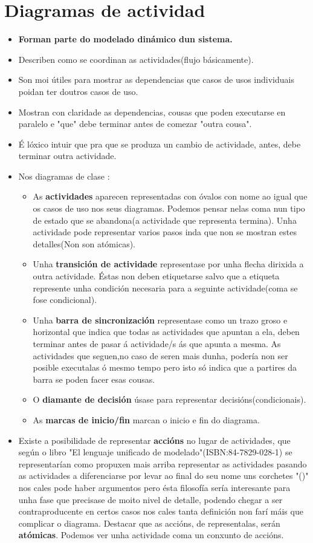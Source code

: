 \section{Diagramas de actividad}
	\begin{itemize}
		\item \textbf{Forman parte do modelado dinámico dun sistema.}
		\item Describen como se coordinan as actividades(flujo básicamente).
		\item Son moi útiles para mostrar as dependencias que casos de usos individuais poidan ter doutros casos de uso.
		\item Mostran con claridade as dependencias, cousas que poden executarse en paralelo e "que" debe terminar antes de comezar "outra cousa".
		\item É lóxico intuir que pra que se produza un cambio de actividade, antes, debe terminar outra actividade.
		\item Nos diagramas de clase :
		\begin{itemize}
			\item As \textbf{actividades} aparecen representadas con óvalos con nome ao igual que os casos de uso nos seus diagramas. Podemos pensar nelas coma nun tipo de estado que se abandona(a actividade que representa termina). Unha actividade pode representar varios pasos inda que non se mostran estes detalles(Non son atómicas).
			\item Unha \textbf{transición de actividade} representase por unha flecha dirixida a outra actividade. Éstas non deben etiquetarse salvo que a etiqueta represente unha condición necesaria para a seguinte actividade(coma se fose condicional).
			\item Unha \textbf{barra de sincronización} representase como un trazo groso e horizontal que indica que todas as actividades que apuntan a ela, deben terminar antes de pasar á actividade/s ás que apunta a mesma. As actividades que seguen,no caso de seren mais dunha, podería non ser posible executalas ó mesmo tempo pero isto só indica que a partires da barra se poden facer esas cousas.
			\item O \textbf{diamante de decisión} úsase para representar decisións(condicionais).
			\item As \textbf{marcas de inicio/fin} marcan o inicio e fin do diagrama.
		\end{itemize}
		\item Existe a posibilidade de representar \textbf{accións} no lugar de actividades, que según o libro "El lenguaje unificado de modelado"(ISBN:84-7829-028-1) se representarían como propuxen mais arriba representar as actividades pasando as actividades a diferenciarse por levar ao final do seu nome uns corchetes "()" nos cales pode haber argumentos pero ésta filosofía sería interesante para unha fase que precisase de moito nivel de detalle, podendo chegar a ser contraproducente en certos casos nos cales tanta definición non farí máis que complicar o diagrama. Destacar que as accións, de representalas, serán \textbf{atómicas}. Podemos ver unha actividade coma un conxunto de accións.
	\end{itemize}